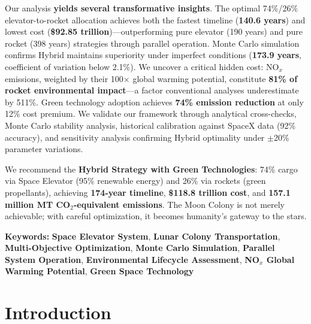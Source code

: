 \documentclass[12pt]{article}
\begin{document}
Our analysis \textbf{yields several transformative insights}. The optimal 74\%/26\% elevator-to-rocket allocation achieves both the fastest timeline (\textbf{140.6 years}) and lowest cost (\textbf{\$92.85 trillion})---outperforming pure elevator (190 years) and pure rocket (398 years) strategies through parallel operation. Monte Carlo simulation confirms Hybrid maintains superiority under imperfect conditions (\textbf{173.9 years}, coefficient of variation below 2.1\%). We uncover a critical hidden cost: NO$_x$ emissions, weighted by their 100$\times$ global warming potential, constitute \textbf{81\% of rocket environmental impact}---a factor conventional analyses underestimate by 511\%. Green technology adoption achieves \textbf{74\% emission reduction} at only 12\% cost premium. We validate our framework through analytical cross-checks, Monte Carlo stability analysis, historical calibration against SpaceX data (92\% accuracy), and sensitivity analysis confirming Hybrid optimality under $\pm$20\% parameter variations.

We recommend the \textbf{Hybrid Strategy with Green Technologies}: 74\% cargo via Space Elevator (95\% renewable energy) and 26\% via rockets (green propellants), achieving \textbf{174-year timeline}, \textbf{\$118.8 trillion cost}, and \textbf{157.1 million MT CO$_2$-equivalent emissions}. The Moon Colony is not merely achievable; with careful optimization, it becomes humanity's gateway to the stars.

\vspace{0.3cm}
\textbf{Keywords:} \textbf{Space Elevator System}, \textbf{Lunar Colony Transportation}, \textbf{Multi-Objective Optimization}, \textbf{Monte Carlo Simulation}, \textbf{Parallel System Operation}, \textbf{Environmental Lifecycle Assessment}, \textbf{NO$_x$ Global Warming Potential}, \textbf{Green Space Technology}
	
	\newpage
	
	\tableofcontents
	\thispagestyle{mainstyle}
	\newpage
	
	\section{Introduction}
	
\end{document}
